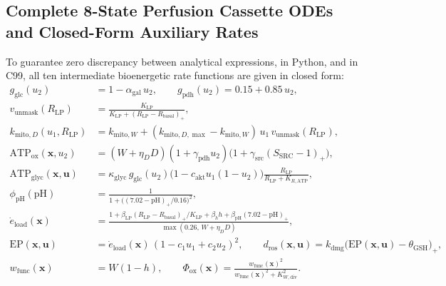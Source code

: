 \documentclass[11pt]{article}
\theoremstyle{plain}
\theoremstyle{remark}
\begin{document}
\subsection{Complete 8-State Perfusion Cassette ODEs and Closed-Form Auxiliary Rates}
\label{app:model}
To guarantee zero discrepancy between analytical expressions,  in Python, and  in C99, all ten intermediate bioenergetic rate functions are given in closed form:
\begin{align}
  g_{\mathrm{glc}}(u_2) &= 1 - \alpha_{\mathrm{gal}}\,u_2, \qquad g_{\mathrm{pdh}}(u_2) = 0.15 + 0.85\,u_2, \label{eq:app_glc} \\
  v_{\mathrm{unmask}}(R_{\mathrm{LP}}) &= \frac{K_{\mathrm{LP}}}{K_{\mathrm{LP}} + (R_{\mathrm{LP}} - R_{\mathrm{basal}})_+}, \label{eq:app_unmask} \\
  k_{\mathrm{mito},D}(u_1, R_{\mathrm{LP}}) &= k_{\mathrm{mito},W} + (k_{\mathrm{mito},D,\max} - k_{\mathrm{mito},W})\,u_1\,v_{\mathrm{unmask}}(R_{\mathrm{LP}}), \label{eq:app_kmd} \\
  \mathrm{ATP}_{\mathrm{ox}}(\mathbf{x}, u_2) &= (W + \eta_D D)(1 + \gamma_{\mathrm{pdh}} u_2)\big(1 + \gamma_{\mathrm{src}}(S_{\mathrm{SRC}} - 1)_+\big), \label{eq:app_atpox} \\
  \mathrm{ATP}_{\mathrm{glyc}}(\mathbf{x}, \mathbf{u}) &= \kappa_{\mathrm{glyc}}\,g_{\mathrm{glc}}(u_2)\big(1 - c_{\mathrm{akt}} u_1(1 - u_2)\big)\frac{R_{\mathrm{LP}}}{R_{\mathrm{LP}} + K_{R,\mathrm{ATP}}}, \label{eq:app_atpglyc} \\
  \phi_{\mathrm{pH}}(\mathrm{pH}) &= \frac{1}{1 + \big((7.02 - \mathrm{pH})_+ / 0.16\big)^2}, \label{eq:app_phiph} \\
  \dot{e}_{\mathrm{load}}(\mathbf{x}) &= \frac{1 + \beta_{\mathrm{LP}}(R_{\mathrm{LP}} - R_{\mathrm{basal}})_+ / K_{\mathrm{LP}} + \beta_h h + \beta_{\mathrm{pH}}(7.02 - \mathrm{pH})_+}{\max(0.26,\, W + \eta_D D)}, \label{eq:app_eload} \\
  \mathrm{EP}(\mathbf{x}, \mathbf{u}) &= \dot{e}_{\mathrm{load}}(\mathbf{x})\,(1 - c_1 u_1 + c_2 u_2)^2, \qquad d_{\mathrm{ros}}(\mathbf{x}, \mathbf{u}) = k_{\mathrm{dmg}}\big(\mathrm{EP}(\mathbf{x}, \mathbf{u}) - \theta_{\mathrm{GSH}}\big)_+, \label{eq:app_ep} \\
  w_{\mathrm{func}}(\mathbf{x}) &= W(1 - h), \qquad \Phi_{\mathrm{ox}}(\mathbf{x}) = \frac{w_{\mathrm{func}}(\mathbf{x})^2}{w_{\mathrm{func}}(\mathbf{x})^2 + K_{W,\mathrm{div}}^2}. \label{eq:app_wfunc}
\end{align}
\end{document}
